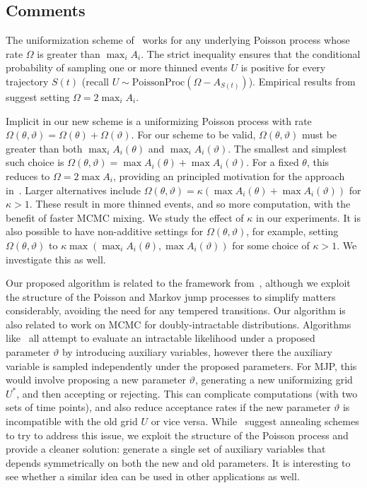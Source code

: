 \subsection{Comments}\label{sec:comments}

The uniformization scheme of~\cite{RaoTeh13} works for any underlying Poisson
process whose rate $\Omega$ is greater than $\max_i A_i$. The strict inequality
ensures that the conditional probability of sampling one or more thinned events 
$U$ is positive for every trajectory $S(t)$ (recall 
$U \sim \text{PoissonProc}(\Omega-A_{S(t)})$). Empirical results from~\cite{RaoTeh13}
suggest setting $\Omega = 2 \max_i A_i$.

Implicit in our new scheme is a uniformizing Poisson process with rate
$\Omega(\theta,\vartheta) = \Omega(\theta) + \Omega(\vartheta)$. For our 
scheme to be valid, $\Omega(\theta,\vartheta)$ must be greater than both
$\max_i A_i(\theta)$ and $\max_i A_i(\vartheta)$. The smallest and simplest such
choice is $\Omega(\theta,\vartheta) = \max A_i(\theta) + \max A_i(\vartheta)$.
For a fixed $\theta$, this reduces to $\Omega = 2\max A_i$, providing
an principled motivation for the approach in~\cite{RaoTeh13}.
Larger alternatives include 
$\Omega(\theta,\vartheta) = \kappa(\max A_i(\theta) + \max A_i(\vartheta))$
for $\kappa > 1$.  These result in more thinned events, and so more 
computation, with the benefit of faster MCMC mixing. We study the effect of 
$\kappa$ in our experiments.
It is also possible to have non-additive settings for $\Omega(\theta,\vartheta)$,
for example, setting $\Omega(\theta,\vartheta)$ to 
$\kappa \max( \max_i A_i(\theta), \max A_i(\vartheta))$ for some choice of $\kappa
> 1$. We investigate this as well.

Our proposed algorithm is related to the framework 
from~\cite{Neal04Drag}, although we exploit the structure of the 
Poisson and Markov jump processes to simplify matters considerably, 
avoiding the need for any tempered transitions. Our algorithm is also related to work 
on MCMC for doubly-intractable distributions.
Algorithms like~\cite{Moller2006,murray2006,Andrieu09} all attempt to evaluate an intractable
likelihood under a proposed parameter $\vartheta$ by introducing auxiliary variables, however there
the auxiliary variable is sampled independently under the proposed parameters. For MJP, this would
involve proposing a new parameter $\vartheta$, generating a new uniformizing grid $U^*$, and then
accepting or rejecting. This can complicate computations (with two sets of time points), and also
reduce acceptance rates if
 the new parameter $\vartheta$ is incompatible with the old grid $U$ or
vice versa. While~\cite{murray2006} suggest annealing schemes to try to address this issue, we exploit
the structure of the Poisson process and provide a cleaner solution: generate a single set of
auxiliary variables that depends symmetrically on both the new and old parameters. It is interesting
to see whether a similar idea can be used in other applications as well.
